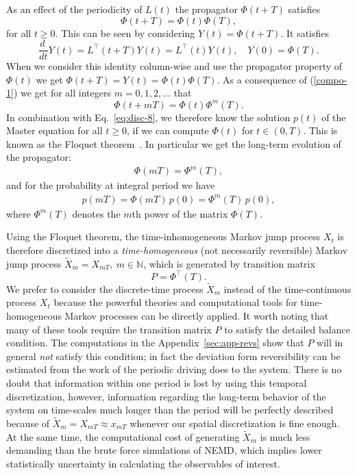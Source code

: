 \documentclass[aps, pre, preprint,unsortedaddress,a4paper,onecolumn]{revtex4}
\newcommand{\recheck}[1]{{\color{red} #1}}
\newcommand{\vect}[1]{#1}
\newcommand{\myphi}{\Phi}
\begin{document}
As an effect of the periodicity of $\vect L(t)$ the propagator $\myphi(t+T)$
satisfies
\begin{equation}\label{compo-1}
\myphi(t+T)=\myphi(t)\myphi(T),
\end{equation}
for all $t\ge 0$. This can be seen by considering $\vect Y(t)=\myphi(t+T)$. It satisfies
\[
\frac{d\ }{dt}\vect Y(t)=\vect L^{\top}(t+T) \vect Y(t)=\vect L^{\top}(t)\vect Y(t),\quad \vect Y(0)=\myphi(T).
\]
When we consider this identity column-wise and use the propagator property of $\myphi(t)$ we get $\myphi(t+T)=\vect Y(t)=\myphi(t)\myphi(T)$. As a consequence of (\ref{compo-1}) we get for all integers $m=0,1,2,\ldots$ that 
\begin{equation}\label{compo-2}
\myphi(t+mT)=\myphi(t)\myphi^m(T).
\end{equation}
In combination with Eq.~\eqref{eq:disc-8}, we therefore
know the solution $\vect p(t)$ of the Master equation for all $t\ge 0$,
if we can compute $\myphi(t)$ for $t\in (0,T)$.
\recheck{This is known as the Floquet theorem~\cite{floquet1883equations}.}
In particular we get the long-term evolution of the propagator:
\begin{align}
\label{eq:floq-13}  
\myphi(mT)=\myphi^m(T),
\end{align}
and for the probability at integral period we have
\begin{align}
  \label{eq:floq-dynamics}
  p(mT) =  \myphi(mT)\, p(0) = \myphi^m(T)\, p(0),
\end{align}
where $\myphi^m(T)$ denotes the $m$th power of the matrix $\myphi(T)$.

\recheck{
Using the Floquet theorem, the time-inhomogeneous Markov jump process $X_t$
is therefore discretized into a \emph{time-homogeneous} (not necessarily
reversible) Markov jump process $\tilde X_{m} = X_{mT}, \ m\in\mathbb
N$, which is generated by transition matrix
\begin{equation}\label{P}
\vect P=\myphi^{\top}(T).
\end{equation}
We prefer to consider the discrete-time process $\tilde X_{m}$ instead of the time-continuous process $X_t$
because the powerful theories and
computational tools for time-homogeneous Markov processes can be directly applied. It worth noting that many of these tools require the transition matrix $P$ to satisfy the detailed balance condition. The computations in the Appendix~\ref{sec:app-revs} show that $P$ will in general \emph{not} satisfy this condition; in fact  the deviation form reversibility can be estimated from the work of the periodic driving does to the system.
There is no doubt that information within one period is lost by using this temporal
discretization, however, information regarding the long-term behavior of the system on time-scales
much longer than the period will be perfectly described because of $\tilde X_{m} = X_{mT}\approx x_{mT}$ whenever our spatial discretization is fine enough.
At the same time,
the computational cost of generating $\tilde X_{m}$ is much less demanding
than the brute force simulations of NEMD, which implies lower
statistically uncertainty in calculating the observables of interest.
}
\end{document}
